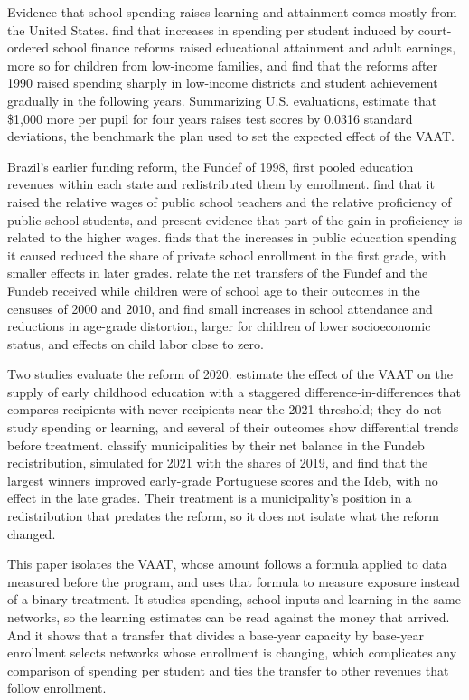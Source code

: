 \documentclass[12pt,letterpaper]{article}
\begin{document}
Evidence that school spending raises learning and attainment comes mostly from the United States. \citet{jackson2016} find that increases in spending per student induced by court-ordered school finance reforms raised educational attainment and adult earnings, more so for children from low-income families, and \citet{lafortune2018} find that the reforms after 1990 raised spending sharply in low-income districts and student achievement gradually in the following years. Summarizing U.S. evaluations, \citet{jackson2024} estimate that \$1,000 more per pupil for four years raises test scores by 0.0316 standard deviations, the benchmark the plan used to set the expected effect of the VAAT.

Brazil's earlier funding reform, the Fundef of 1998, first pooled education revenues within each state and redistributed them by enrollment. \citet{menezes2007} find that it raised the relative wages of public school teachers and the relative proficiency of public school students, and present evidence that part of the gain in proficiency is related to the higher wages. \citet{estevan2015} finds that the increases in public education spending it caused reduced the share of private school enrollment in the first grade, with smaller effects in later grades. \citet{cruz2018} relate the net transfers of the Fundef and the Fundeb received while children were of school age to their outcomes in the censuses of 2000 and 2010, and find small increases in school attendance and reductions in age-grade distortion, larger for children of lower socioeconomic status, and effects on child labor close to zero.

Two studies evaluate the reform of 2020. \citet{franca2026} estimate the effect of the VAAT on the supply of early childhood education with a staggered difference-in-differences that compares recipients with never-recipients near the 2021 threshold; they do not study spending or learning, and several of their outcomes show differential trends before treatment. \citet{lima2025fundeb} classify municipalities by their net balance in the Fundeb redistribution, simulated for 2021 with the shares of 2019, and find that the largest winners improved early-grade Portuguese scores and the Ideb, with no effect in the late grades. Their treatment is a municipality's position in a redistribution that predates the reform, so it does not isolate what the reform changed.

This paper isolates the VAAT, whose amount follows a formula applied to data measured before the program, and uses that formula to measure exposure instead of a binary treatment. It studies spending, school inputs and learning in the same networks, so the learning estimates can be read against the money that arrived. And it shows that a transfer that divides a base-year capacity by base-year enrollment selects networks whose enrollment is changing, which complicates any comparison of spending per student and ties the transfer to other revenues that follow enrollment.
\end{document}
